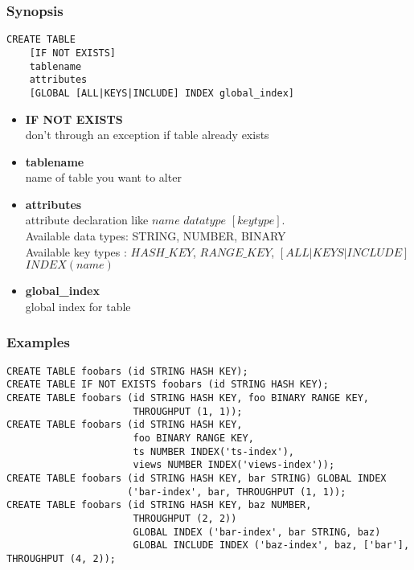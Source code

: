 \subsubsection{Synopsis}
\lstset{language=Java}
\begin{lstlisting}
CREATE TABLE
    [IF NOT EXISTS]
    tablename
    attributes
    [GLOBAL [ALL|KEYS|INCLUDE] INDEX global_index]	
\end{lstlisting}
\begin{itemize}
	\item \textbf{IF NOT EXISTS}\\
	don't through an exception if table already exists
	\item \textbf{tablename} \\
	name of table you want to alter
	\item \textbf{attributes} \\
	attribute declaration like $name$ $data type$  $[key type] $. \\
	Available data types: STRING, NUMBER, BINARY \\
	Available key types : $HASH\_KEY$, $RANGE\_KEY$, $[ALL|KEYS|INCLUDE]$ $INDEX(name) $
	\item \textbf{global\_index}\\
	global index for table
\end{itemize}

\subsubsection{Examples}
\lstset{language=Java}
\begin{lstlisting}
CREATE TABLE foobars (id STRING HASH KEY);
CREATE TABLE IF NOT EXISTS foobars (id STRING HASH KEY);
CREATE TABLE foobars (id STRING HASH KEY, foo BINARY RANGE KEY,
                      THROUGHPUT (1, 1));
CREATE TABLE foobars (id STRING HASH KEY,
                      foo BINARY RANGE KEY,
                      ts NUMBER INDEX('ts-index'),
                      views NUMBER INDEX('views-index'));
CREATE TABLE foobars (id STRING HASH KEY, bar STRING) GLOBAL INDEX
                     ('bar-index', bar, THROUGHPUT (1, 1));
CREATE TABLE foobars (id STRING HASH KEY, baz NUMBER,
                      THROUGHPUT (2, 2))
                      GLOBAL INDEX ('bar-index', bar STRING, baz)
                      GLOBAL INCLUDE INDEX ('baz-index', baz, ['bar'], THROUGHPUT (4, 2));	
\end{lstlisting}
\vspace{40pt}

